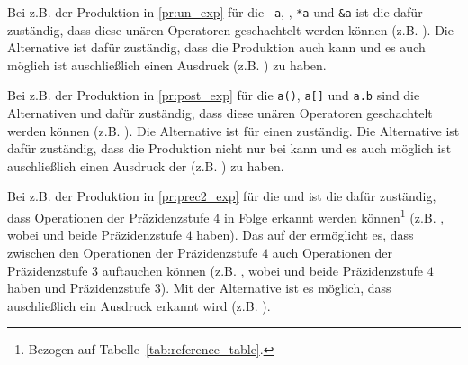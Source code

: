 Bei z.B. der Produktion  in \ref{pr:un_exp} für die  \verb|-a|, , \verb|*a| und \verb|&a| ist die   dafür zuständig, dass diese unären Operatoren  geschachtelt werden können (z.B. ). Die Alternative   ist dafür zuständig, dass die Produktion auch  kann und es auch möglich ist auschließlich einen Ausdruck  (z.B. ) zu haben.

\begin{grammar}
\end{grammar}

Bei z.B. der Produktion  in \ref{pr:post_exp} für die  \verb|a()|, \verb|a[]| und \verb|a.b| sind die Alternativen  und  dafür zuständig, dass diese unären Operatoren  geschachtelt werden können (z.B. ). Die Alternative  ist für einen  zuständig. Die Alternative  ist dafür zuständig, dass die Produktion nicht nur bei   kann und es auch möglich ist auschließlich einen Ausdruck der  (z.B. ) zu haben.

\begin{grammar}
\end{grammar}


Bei z.B. der Produktion  in \ref{pr:prec2_exp} für die   und  ist die   dafür zuständig, dass  Operationen der Präzidenzstufe $4$ in Folge erkannt werden können\footnote{Bezogen auf Tabelle~\ref{tab:reference_table}.} (z.B. , wobei \smalltt{-} und \smalltt{+} beide Präzidenzstufe $4$ haben). Das   auf der  ermöglicht es, dass zwischen den Operationen der Präzidenzstufe $4$ auch Operationen der Präzidenzstufe $3$ auftauchen können (z.B. , wobei \smalltt{-} und \smalltt{+} beide Präzidenzstufe $4$ haben und \smalltt{/} Präzidenzstufe $3$). Mit der Alternative  ist es möglich, dass auschließlich ein Ausdruck  erkannt wird (z.B. ).


